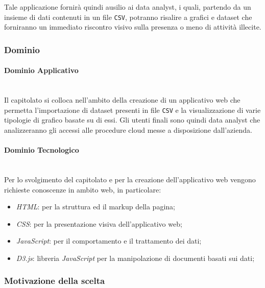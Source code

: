 \documentclass[11pt]{article}
\begin{document}
    Tale applicazione fornirà quindi ausilio ai data analyst, i quali, partendo da un insieme di dati contenuti in un file
    \texttt{CSV}, potranno risalire a grafici e dataset che forniranno un immediato riscontro visivo sulla presenza o meno di attività
    illecite.
    
    \subsubsection{Dominio}
        \paragraph{Dominio Applicativo}~\\
        
        \noindent
        Il capitolato si colloca nell'ambito della creazione di un applicativo web che permetta l'importazione di dataset presenti in
        file \texttt{CSV} e la visualizzazione di varie tipologie di grafico basate su di essi.
        Gli utenti finali sono quindi data analyst che analizzeranno gli accessi alle procedure cloud messe a disposizione dall'azienda.
        
        \paragraph{Dominio Tecnologico}~\\
        
        \noindent
        Per lo svolgimento del capitolato e per la creazione dell'applicativo web vengono richieste conoscenze in ambito web, in
        particolare:
        \begin{itemize}
            \item \textit{HTML}: per la struttura ed il markup della pagina;
            \item \textit{CSS}: per la presentazione visiva dell'applicativo web;
            \item \textit{JavaScript}: per il comportamento e il trattamento dei dati;
            \item \textit{D3.js}: libreria \textit{JavaScript} per la manipolazione di documenti basati sui dati;
        \end{itemize}
    
    \subsubsection{Motivazione della scelta}
\end{document}
